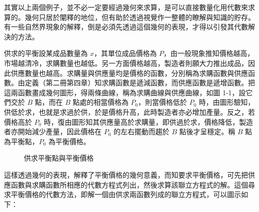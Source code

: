 其實以上兩個例子，並不必一定要經過幾何來求算，是可以直接數量化用代數來求算的。幾何只居於闡釋的地位，但有助於透過視覺作一整體的瞭解與知識的貯存。有一些自然界現象的解釋，倒是必須先透過這個幾何的表現，才得以引發其代數解決的方法。

\begin{example}
供求的平衡\quad 設某成品數量為 $x$，其單位成品價格為 $P$，由一般現象推知價格越高，市場越清冷，求購數量也越低。另一方面價格越高，製造者則願大力推出成品，因此供應數量也越高。求購量與供應量均是價格的函數，分別稱為求購函數與供應函數。由定義（第二冊第四章）知求購函數是遞減函數，而供應函數是遞增函數。把這兩函數畫成幾何圖形，得兩條曲線，稱為求購曲線與供應曲線，如圖 1-1，設它們交於 $B$ 點，而在 $B$ 點處的相當價格為 $P_0$，則當價格低於 $P_0$ 時，由圖形驗知，供低於求，也就是求過於供，於是價格升高，此時製造者亦必增加產量。反之，若價格高於 $P_0$ 時，復由圖形知其供應量高於求購量，即供過於求，價格降低，製造者亦開始減少產量，因此價格在 $P_0$ 的左右擺動而趨於 $B$ 點後才呈穩定。稱 $B$ 點為平衡點，$P_0$ 為平衡價格。
\end{example}

\begin{figure}[H]
\centering
{}
\caption{供求平衡點與平衡價格}
\label{fig:b3s-fig1-1}
\end{figure}

這樣透過幾何的表現，解釋了平衡價格的幾何意義，而知要求平衡價格，可先把供應函數與求購函數所相應的代數方程式列出，然後求算該聯立方程式的解。這個尋求平衡價格的代數方法，即解一個由供求兩函數列成的聯立方程式，可以圖示如下：

